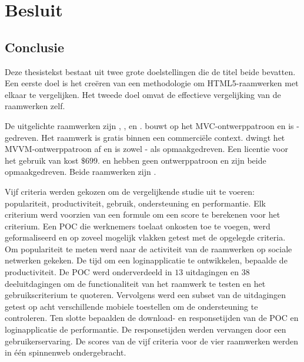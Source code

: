 \chapter{Besluit}
\label{chap:besluit}

\section{Conclusie} %

Deze thesistekst bestaat uit twee grote doelstellingen die de titel beide bevatten.
Een eerste doel is het creëren van een methodologie om HTML5-raamwerken met elkaar te vergelijken.
Het tweede doel omvat de effectieve vergelijking van de raamwerken zelf.

De uitgelichte raamwerken zijn \st{}, \kendo{},  \jqm{} en \lungo{}.
\st{} bouwt op het MVC-ontwerppatroon en is \js-gedreven.
Het raamwerk is gratis binnen een commerciële context.
\kendo{} dwingt het MVVM-ontwerppatroon af en is zowel \js- als opmaakgedreven.
Een licentie voor het gebruik van \kendo{} kost $\$699$.
\jqm{} en \lungo{} hebben geen ontwerppatroon en zijn beide opmaakgedreven.
Beide raamwerken zijn .

Vijf criteria werden gekozen om de vergelijkende studie uit te voeren:  populariteit,  productiviteit,  gebruik,  ondersteuning en performantie.
Elk criterium werd voorzien van een formule om een score te berekenen voor het criterium.
Een POC die werknemers toelaat onkosten toe te voegen, werd geformaliseerd en op zoveel mogelijk vlakken getest met de opgelegde criteria.
Om populariteit te meten werd naar de activiteit van de raamwerken op sociale netwerken gekeken.
De tijd om een loginapplicatie te ontwikkelen, bepaalde de productiviteit.
De POC werd onderverdeeld in $13$ uitdagingen en $38$ deeluitdagingen om de functionaliteit van het raamwerk te testen en het gebruikscriterium te quoteren.
Vervolgens werd een subset van de uitdagingen getest op acht verschillende mobiele toestellen om de ondersteuning te controleren.
Ten slotte bepaalden de download- en responsetijden van de POC en loginapplicatie de performantie.
De responsetijden werden vervangen door een gebruikerservaring.
De scores van de vijf criteria voor de vier raamwerken werden in één spinnenweb ondergebracht.

